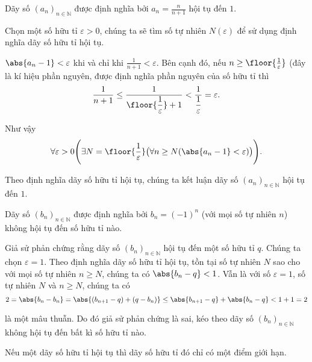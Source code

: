 \begin{example}
    Dãy số ${(a_{n})}_{n\in\mathbb{N}}$ được định nghĩa bởi $a_{n} = \frac{n}{n+1}$ hội tụ đến $1$.

    Chọn một số hữu tỉ $\varepsilon > 0$, chúng ta sẽ tìm số tự nhiên $N(\varepsilon)$ để sử dụng định nghĩa dãy số hữu tỉ hội tụ.

    $\abs{a_{n} - 1} < \varepsilon$ khi và chỉ khi $\frac{1}{n+1} < \varepsilon$. Bên cạnh đó, nếu $n \geq \floor{\frac{1}{\varepsilon}}$ (đây là kí hiệu phần nguyên, được định nghĩa phần nguyên của số hữu tỉ thì
    \[
        \frac{1}{n+1}\leq \frac{1}{\floor{\dfrac{1}{\varepsilon}} + 1} < \frac{1}{\dfrac{1}{\varepsilon}} = \varepsilon.
    \]

    Như vậy
    \[
        \forall\varepsilon > 0 \Biggl( \exists N=\floor{\frac{1}{\varepsilon}}\bigl(\forall n\geq N ( \abs{a_{n} - 1} < \varepsilon )\bigr) \Biggr).
    \]

    Theo định nghĩa dãy số hữu tỉ hội tụ, chúng ta kết luận dãy số ${(a_{n})}_{n\in\mathbb{N}}$ hội tụ đến $1$.
\end{example}

\begin{counterexample}
    Dãy số ${(b_{n})}_{n\in\mathbb{N}}$ được định nghĩa bởi $b_{n} = {(-1)}^{n}$ (với mọi số tự nhiên $n$) không hội tụ đến số hữu tỉ nào.

    Giả sử phản chứng rằng dãy số ${(b_{n})}_{n\in\mathbb{N}}$ hội tụ đến một số hữu tỉ $q$. Chúng ta chọn $\varepsilon = 1$. Theo định nghĩa dãy số hữu tỉ hội tụ, tồn tại số tự nhiên $N$ sao cho với mọi số tự nhiên $n\geq N$, chúng ta có $\abs{b_{n} - q} < 1$. Vẫn là với số $\varepsilon = 1$, số tự nhiên $N$ và $n\ge N$, chúng ta có
    \[
        2 = \abs{b_{n} - b_{n}} = \abs{(b_{n+1} - q) + (q - b_{n})} \leq \abs{b_{n+1} - q} + \abs{b_{n} - q} < 1 + 1 = 2
    \]

    là một mâu thuẫn. Do đó giả sử phản chứng là sai, kéo theo dãy số ${(b_{n})}_{n\in\mathbb{N}}$ không hội tụ đến bất kì số hữu tỉ nào.
\end{counterexample}

\begin{theorem}\label{theorem:uniqueness-of-limit-points-of-convergence-rational-sequences}
    Nếu một dãy số hữu tỉ hội tụ thì dãy số hữu tỉ đó chỉ có một điểm giới hạn.
\end{theorem}

